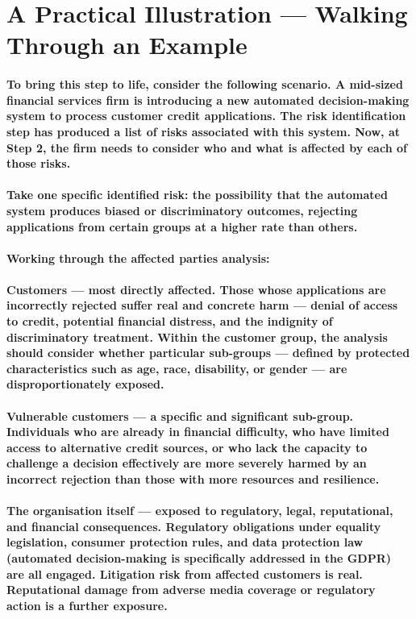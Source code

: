\section{A Practical Illustration — Walking Through an Example}
\paragraph{To bring this step to life, consider the following scenario. A mid-sized financial services firm is introducing a new automated decision-making system to process customer credit applications. The risk identification step has produced a list of risks associated with this system. Now, at Step 2, the firm needs to consider who and what is affected by each of those risks.}
\paragraph{Take one specific identified risk: \textbf{the possibility that the automated system produces biased or discriminatory outcomes, rejecting applications from certain groups at a higher rate than others}.}
\paragraph{Working through the affected parties analysis:}
\paragraph{\textbf{Customers} — most directly affected. Those whose applications are incorrectly rejected suffer real and concrete harm — denial of access to credit, potential financial distress, and the indignity of discriminatory treatment. Within the customer group, the analysis should consider whether particular sub-groups — defined by protected characteristics such as age, race, disability, or gender — are disproportionately exposed.}
\paragraph{\textbf{Vulnerable customers} — a specific and significant sub-group. Individuals who are already in financial difficulty, who have limited access to alternative credit sources, or who lack the capacity to challenge a decision effectively are more severely harmed by an incorrect rejection than those with more resources and resilience.}
\paragraph{\textbf{The organisation itself} — exposed to regulatory, legal, reputational, and financial consequences. Regulatory obligations under equality legislation, consumer protection rules, and data protection law (automated decision-making is specifically addressed in the GDPR) are all engaged. Litigation risk from affected customers is real. Reputational damage from adverse media coverage or regulatory action is a further exposure.}
